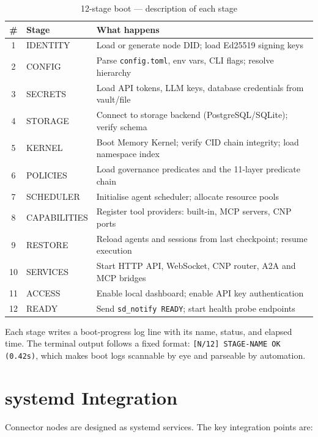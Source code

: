 \begin{table}[H]
\centering
\renewcommand{\arraystretch}{1.35}
\begin{tabularx}{\textwidth}{@{}clX@{}}
\toprule
\textbf{\#} & \textbf{Stage} & \textbf{What happens} \\
\midrule
1  & IDENTITY     & Load or generate node DID; load Ed25519 signing keys \\
2  & CONFIG       & Parse \texttt{config.toml}, env vars, CLI flags; resolve hierarchy \\
3  & SECRETS      & Load API tokens, LLM keys, database credentials from vault/file \\
4  & STORAGE      & Connect to storage backend (PostgreSQL/SQLite); verify schema \\
5  & KERNEL       & Boot Memory Kernel; verify CID chain integrity; load namespace index \\
6  & POLICIES     & Load governance predicates and the 11-layer predicate chain \\
7  & SCHEDULER    & Initialise agent scheduler; allocate resource pools \\
8  & CAPABILITIES & Register tool providers: built-in, MCP servers, CNP ports \\
9  & RESTORE      & Reload agents and sessions from last checkpoint; resume execution \\
10 & SERVICES     & Start HTTP API, WebSocket, CNP router, A2A and MCP bridges \\
11 & ACCESS       & Enable local dashboard; enable API key authentication \\
12 & READY        & Send \texttt{sd\_notify READY}; start health probe endpoints \\
\bottomrule
\end{tabularx}
\caption{12-stage boot — description of each stage}
\end{table}

Each stage writes a boot-progress log line with its name, status, and elapsed
time. The terminal output follows a fixed format:
\texttt{[N/12] STAGE-NAME  OK (0.42s)}, which makes boot logs scannable by eye
and parseable by automation.

\section{systemd Integration}

Connector nodes are designed as systemd services. The key integration points
are:

